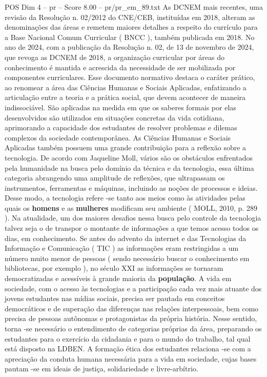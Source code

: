 \begin{textsample}{POS Dim 4 – pr – Score 8.00 – pr/pr\_em\_89.txt}
As DCNEM mais recentes, uma revisão da Resolução n. 02/2012 do CNE/CEB, instituídas em 2018, alteram as denominações das áreas e remetem maiores detalhes a respeito do currículo para a Base Nacional Comum Curricular ( BNCC ), também publicada em 2018.
No ano de 2024, com a publicação da Resolução n. 02, de 13 de novembro de 2024, que revoga as DCNEM de 2018, a organização curricular por áreas do conhecimento é mantida e acrescida da necessidade de ser mobilizada por componentes curriculares.
Esse documento normativo destaca o caráter prático, ao renomear a área das Ciências Humanas e Sociais Aplicadas, enfatizando a articulação entre a teoria e a prática social, que devem acontecer de maneira indissociável.
São aplicadas na medida em que os saberes formais por elas desenvolvidos são utilizados em situações concretas da vida cotidiana, aprimorando a capacidade dos estudantes de resolver problemas e dilemas complexos da sociedade contemporânea.
As Ciências Humanas e Sociais Aplicadas também possuem uma grande contribuição para a reflexão sobre a tecnologia.
De acordo com Jaqueline Moll, vários são os obstáculos enfrentados pela humanidade na busca pelo domínio da técnica e da tecnologia, essa última categoria abrangendo uma amplitude de reflexões, que ultrapassam os instrumentos, ferramentas e máquinas, incluindo as noções de processos e ideias.
Desse modo, a tecnologia refere -se tanto aos meios como às atividades pelas quais os \textbf{homens} e as \textbf{mulheres} modificam seu ambiente ( MOLL, 2010, p. 289 ).
Na atualidade, um dos maiores desafios nessa busca pelo controle da tecnologia talvez seja o de transpor o montante de informações a que temos acesso todos os dias, em conhecimento.
Se antes do advento da internet e das Tecnologias da Informação e Comunicação ( TIC ) as informações eram restringidas a um número muito menor de pessoas ( sendo necessário buscar o conhecimento em bibliotecas, por exemplo ), no século XXI as informações se tornaram democratizadas e acessíveis à grande maioria da \textbf{população}.
A vida em sociedade, com o acesso às tecnologias e a participação cada vez mais atuante dos jovens estudantes nas mídias sociais, precisa ser pautada em conceitos democráticos e de superação das diferenças nas relações interpessoais, bem como precisa de pessoas autônomas e protagonistas da própria história.
Nesse sentido, torna -se necessário o entendimento de categorias próprias da área, preparando os estudantes para o exercício da cidadania e para o mundo do trabalho, tal qual está disposto na LDBEN.
A formação ética dos estudantes relaciona -se com a apreciação da conduta humana necessária para a vida em sociedade, cujas bases pautam -se em ideais de justiça, solidariedade e livre-arbítrio.

\end{textsample}
